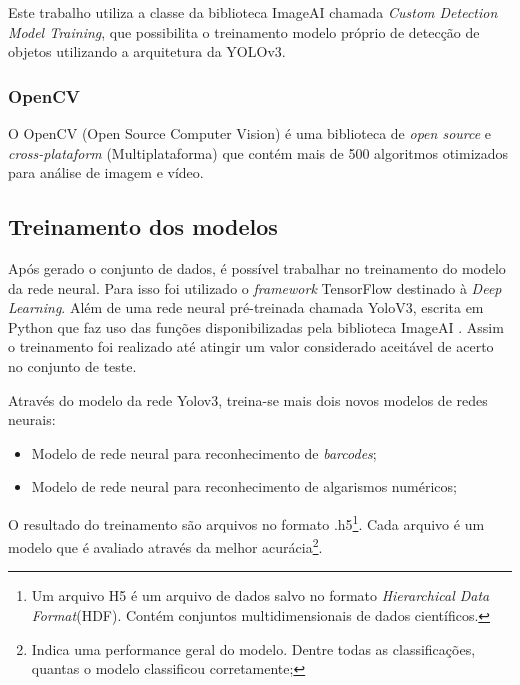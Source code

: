Este trabalho utiliza a classe da biblioteca ImageAI chamada \textit{Custom Detection Model Training}, que possibilita o treinamento modelo próprio de detecção de objetos utilizando a arquitetura da YOLOv3.


\subsubsection{OpenCV}

O OpenCV (Open Source Computer Vision) é uma biblioteca de \textit{open source} e \textit{cross-plataform} (Multiplataforma) que contém mais de 500 algoritmos otimizados para análise de imagem e vídeo. \cite{opencv}


\subsection{Treinamento dos modelos}

Após gerado o conjunto de dados, é possível trabalhar no treinamento do modelo da rede neural. Para isso foi utilizado o \textit{framework} TensorFlow destinado à \textit{Deep Learning}. Além de uma rede neural pré-treinada chamada YoloV3, escrita em Python que faz uso das funções disponibilizadas pela biblioteca ImageAI . Assim o treinamento foi realizado até atingir um valor considerado aceitável de acerto no conjunto de teste. 

Através do modelo da rede Yolov3, treina-se mais dois novos modelos de redes neurais:
\begin{itemize}
    \item Modelo de rede neural para reconhecimento de \textit{barcodes};
    \item Modelo de rede neural para reconhecimento de algarismos numéricos;
\end{itemize}

O resultado do treinamento são arquivos no formato .h5\footnote{Um arquivo H5 é um arquivo de dados salvo no formato \textit{Hierarchical Data Format}(HDF). Contém conjuntos multidimensionais de dados científicos.}. Cada arquivo é um modelo que é avaliado através da melhor acurácia\footnote{Indica uma performance geral do modelo. Dentre todas as classificações, quantas o modelo classificou corretamente;}.


